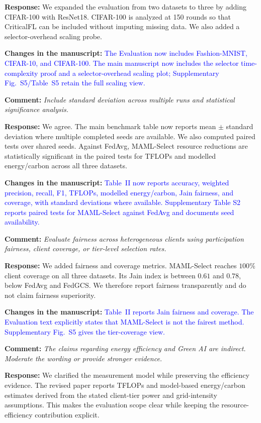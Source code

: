 \documentclass[11pt]{article}
\newcommand{\comment}[1]{\textbf{Comment:} \textit{#1}}
\newcommand{\response}[1]{\textbf{Response:} #1}
\newcommand{\change}[1]{\textbf{Changes in the manuscript:} \textcolor{blue}{#1}}
\begin{document}
\response{We expanded the evaluation from two datasets to three by adding CIFAR-100 with ResNet18. CIFAR-100 is analyzed at 150 rounds so that CriticalFL can be included without imputing missing data. We also added a selector-overhead scaling probe.}

\change{The Evaluation now includes Fashion-MNIST, CIFAR-10, and CIFAR-100. The main manuscript now includes the selector time-complexity proof and a selector-overhead scaling plot; Supplementary Fig.~S5/Table~S5 retain the full scaling view.}

\comment{Include standard deviation across multiple runs and statistical significance analysis.}

\response{We agree. The main benchmark table now reports mean $\pm$ standard deviation where multiple completed seeds are available. We also computed paired tests over shared seeds. Against FedAvg, MAML-Select resource reductions are statistically significant in the paired tests for TFLOPs and modelled energy/carbon across all three datasets.}

\change{Table~II now reports accuracy, weighted precision, recall, F1, TFLOPs, modelled energy/carbon, Jain fairness, and coverage, with standard deviations where available. Supplementary Table S2 reports paired tests for MAML-Select against FedAvg and documents seed availability.}

\comment{Evaluate fairness across heterogeneous clients using participation fairness, client coverage, or tier-level selection rates.}

\response{We added fairness and coverage metrics. MAML-Select reaches $100\%$ client coverage on all three datasets. Its Jain index is between $0.61$ and $0.78$, below FedAvg and FedGCS. We therefore report fairness transparently and do not claim fairness superiority.}

\change{Table~II reports Jain fairness and coverage. The Evaluation text explicitly states that MAML-Select is not the fairest method. Supplementary Fig.~S5 gives the tier-coverage view.}

\comment{The claims regarding energy efficiency and Green AI are indirect. Moderate the wording or provide stronger evidence.}

\response{We clarified the measurement model while preserving the efficiency evidence. The revised paper reports TFLOPs and model-based energy/carbon estimates derived from the stated client-tier power and grid-intensity assumptions. This makes the evaluation scope clear while keeping the resource-efficiency contribution explicit.}
\end{document}
